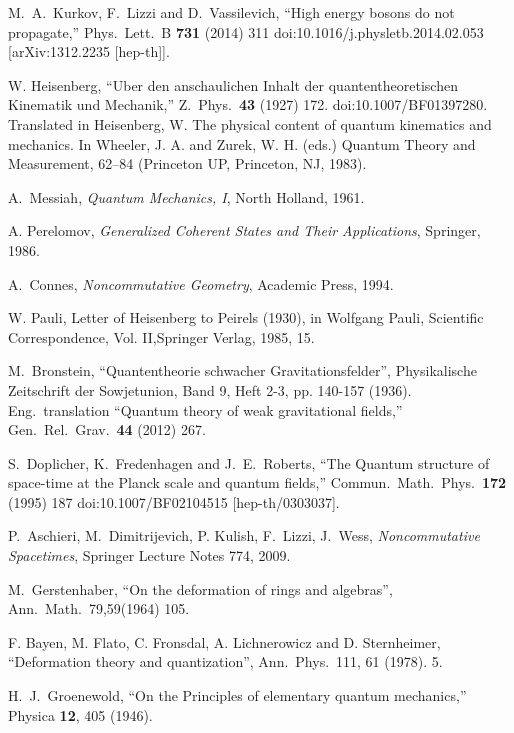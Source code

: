 \documentclass[12pt,a4paper]{article}
\begin{document}
\begin{thebibliography}{99}

M.~A.~Kurkov, F.~Lizzi and D.~Vassilevich,
  ``High energy bosons do not propagate,''
  Phys.\ Lett.\ B {\bf 731} (2014) 311
  doi:10.1016/j.physletb.2014.02.053
  [arXiv:1312.2235 [hep-th]].

W. Heisenberg,
  ``Uber den anschaulichen Inhalt der quantentheoretischen Kinematik und Mechanik,''
  Z.\ Phys.\  {\bf 43} (1927) 172.
  doi:10.1007/BF01397280. Translated in Heisenberg, W. The physical content of quantum kinematics and mechanics. In Wheeler, J. A. and Zurek, W. H. (eds.) Quantum Theory and Measurement, 62–84 (Princeton UP, Princeton, NJ,
1983). 
 
  A.~Messiah, \textit{Quantum Mechanics, I}, North Holland, 1961.
 
  A. Perelomov, \textit{Generalized Coherent States and
Their Applications},  Springer, 1986.
 
  A.\ Connes, \textit{Noncommutative Geometry}, Academic Press, 1994.

 W. Pauli, Letter of Heisenberg to Peirels (1930), in Wolfgang Pauli, Scientific Correspondence, Vol. II,Springer Verlag, 1985, 15.

M.~Bronstein, ``Quantentheorie schwacher Gravitationsfelder'', Physikalische Zeitschrift der Sowjetunion, Band 9, Heft 2-3, pp. 140-157 (1936). Eng.\  translation ``Quantum theory of weak gravitational fields,''
  Gen.\ Rel.\ Grav.\  {\bf 44} (2012) 267.
  
 S.~Doplicher, K.~Fredenhagen and J.~E.~Roberts,
  ``The Quantum structure of space-time at the Planck scale and quantum fields,''
  Commun.\ Math.\ Phys.\  {\bf 172} (1995) 187
  doi:10.1007/BF02104515
  [hep-th/0303037].
  
 P.~Aschieri, M.~Dimitrijevich, P. Kulish, F.~Lizzi, J.~Wess, \textit{Noncommutative Spacetimes}, Springer Lecture Notes 774, 2009.

 M.\ Gerstenhaber, ``On the deformation of rings and algebras'', Ann.\ Math.\ 79,59(1964) 105.

 F. Bayen, M. Flato, C. Fronsdal, A. Lichnerowicz and D. Sternheimer, ``Deformation theory
and quantization'', Ann.\ Phys.\ 111, 61 (1978). 5.

 H.~J.~Groenewold,
  ``On the Principles of elementary quantum mechanics,''
  Physica {\bf 12}, 405 (1946).


\end{thebibliography}
\end{document}

